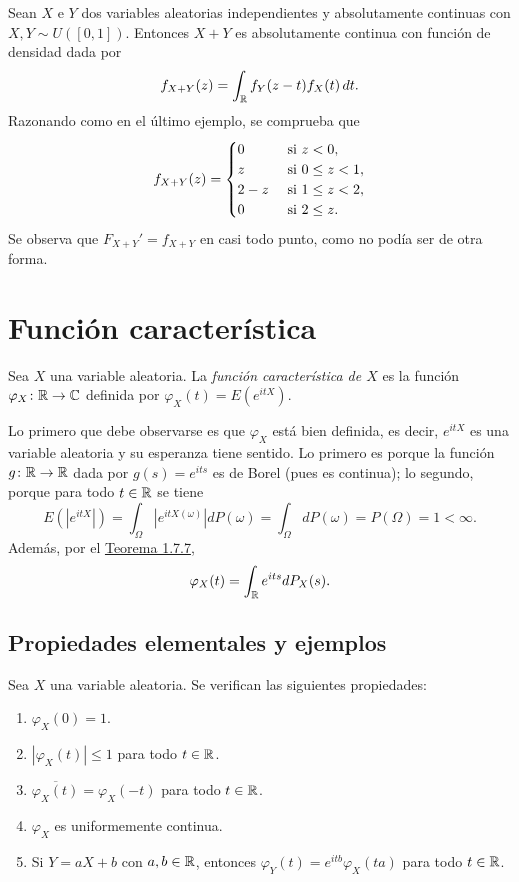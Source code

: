 \documentclass[a4paper, 11pt, extrafontsizes]{memoir}
\begin{document}
\begin{example}
    Sean $X$ e $Y$ dos variables aleatorias independientes y absolutamente continuas con $X,Y \sim U([0,1])$. Entonces $X+Y$ es absolutamente continua con función de densidad dada por
    \[f_{X+Y}(z)= \int_\mathbb R f_Y(z-t) f_X(t) \, dt.\]
    Razonando como en el último ejemplo, se comprueba que
    \[f_{X+Y}(z)=\begin{cases}
        0 & $ si $ z < 0, \\
        z & $ si $ 0 \leq z < 1, \\
        2-z & $ si $ 1 \leq z < 2, \\
        0 & $ si $ 2 \leq z.
    \end{cases}\]
    Se observa que $F_{X+Y}' = f_{X+Y}$ en casi todo punto, como no podía ser de otra forma. 
\end{example}


\chapter{Función característica}

\begin{definition}
    Sea $X$ una variable aleatoria. La \emph{función característica de $X$} es la función $\varphi_X \colon \mathbb R \to \mathbb C$ definida por $\varphi_X(t) = E(e^{itX})$.
\end{definition}

Lo primero que debe observarse es que $\varphi_X$ está bien definida, es decir, $e^{itX}$ es una variable aleatoria y su esperanza tiene sentido. Lo primero es porque la función $g \colon \mathbb R \to \mathbb R$ dada por $g(s) = e^{its}$ es de Borel (pues es continua); lo segundo, porque para todo $t \in \mathbb R$ se tiene
\[E(|e^{itX}|) = \int_\Omega |e^{itX(\omega)}| dP(\omega) = \int_\Omega dP(\omega) = P(\Omega) = 1 < \infty.\]
Además, por el \hyperref[teo:1.6.7]{\color{gray}Teorema 1.7.7},
\[\varphi_X(t) = \int_\mathbb R e^{its} dP_X(s).\]

\section{Propiedades elementales y ejemplos}

\begin{proposition}
    Sea $X$ una variable aleatoria. Se verifican las siguientes propiedades:
    \begin{enumerate}
        \item $\varphi_X(0)=1$.
        \item $|\varphi_X(t)| \leq 1$ para todo $t \in \mathbb R$.
        \item $\overline{\varphi_X(t)} = \varphi_X(-t)$ para todo $t \in \mathbb R$.
        \item $\varphi_X$ es uniformemente continua.
        \item Si $Y = aX+b$ con $a,b \in \mathbb R$, entonces $\varphi_Y(t) = e^{itb}\varphi_X(ta)$ para todo $t \in \mathbb R$.
    \end{enumerate}
\end{proposition}
\end{document}

